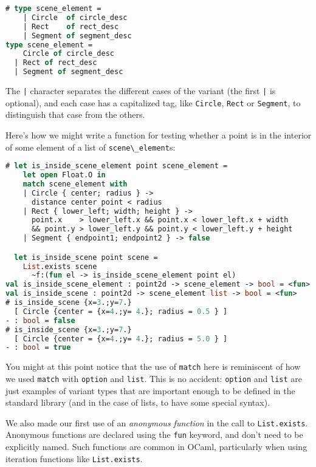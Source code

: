 \begin{lstlisting}[language=Caml]
# type scene_element =
    | Circle  of circle_desc
    | Rect    of rect_desc
    | Segment of segment_desc
type scene_element =
    Circle of circle_desc
  | Rect of rect_desc
  | Segment of segment_desc
\end{lstlisting}

The \passthrough{\lstinline!|!} character separates the different cases
of the variant (the first \passthrough{\lstinline!|!} is optional), and
each case has a capitalized tag, like \passthrough{\lstinline!Circle!},
\passthrough{\lstinline!Rect!} or \passthrough{\lstinline!Segment!}, to
distinguish that case from the others.

Here's how we might write a function for testing whether a point is in
the interior of some element of a list of
\passthrough{\lstinline!scene\_element!}s:

\begin{lstlisting}[language=Caml]
# let is_inside_scene_element point scene_element =
    let open Float.O in
    match scene_element with
    | Circle { center; radius } ->
      distance center point < radius
    | Rect { lower_left; width; height } ->
      point.x    > lower_left.x && point.x < lower_left.x + width
      && point.y > lower_left.y && point.y < lower_left.y + height
    | Segment { endpoint1; endpoint2 } -> false

  let is_inside_scene point scene =
    List.exists scene
      ~f:(fun el -> is_inside_scene_element point el)
val is_inside_scene_element : point2d -> scene_element -> bool = <fun>
val is_inside_scene : point2d -> scene_element list -> bool = <fun>
# is_inside_scene {x=3.;y=7.}
  [ Circle {center = {x=4.;y= 4.}; radius = 0.5 } ]
- : bool = false
# is_inside_scene {x=3.;y=7.}
  [ Circle {center = {x=4.;y= 4.}; radius = 5.0 } ]
- : bool = true
\end{lstlisting}

You might at this point notice that the use of
\passthrough{\lstinline!match!} here is reminiscent of how we used
\passthrough{\lstinline!match!} with \passthrough{\lstinline!option!}
and \passthrough{\lstinline!list!}. This is no accident:
\passthrough{\lstinline!option!} and \passthrough{\lstinline!list!} are
just examples of variant types that are important enough to be defined
in the standard library (and in the case of lists, to have some special
syntax).

We also made our first use of an \emph{anonymous function} in the call
to \passthrough{\lstinline!List.exists!}. Anonymous functions are
declared using the \passthrough{\lstinline!fun!} keyword, and don't need
to be explicitly named. Such functions are common in OCaml, particularly
when using iteration functions like
\passthrough{\lstinline!List.exists!}.

